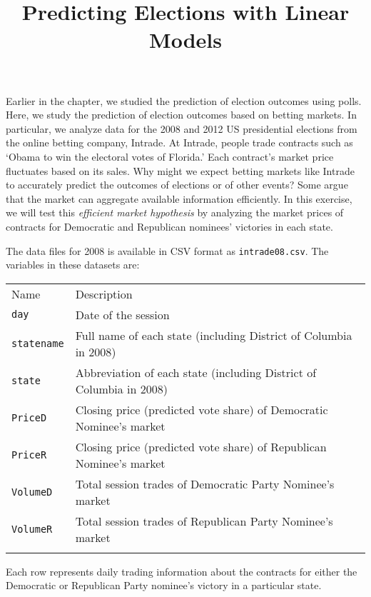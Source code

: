 \documentclass[]{article}
\title{Predicting Elections with Linear Models}
\author{}
\date{}
\begin{document}
\maketitle


Earlier in the chapter, we studied the prediction of election outcomes
using polls. Here, we study the prediction of election outcomes based on
betting markets. In particular, we analyze data for the 2008 and 2012 US
presidential elections from the online betting company, Intrade. At
Intrade, people trade contracts such as `Obama to win the electoral
votes of Florida.' Each contract's market price fluctuates based on its
sales. Why might we expect betting markets like Intrade to accurately
predict the outcomes of elections or of other events? Some argue that
the market can aggregate available information efficiently. In this
exercise, we will test this \emph{efficient market hypothesis} by
analyzing the market prices of contracts for Democratic and Republican
nominees' victories in each state.

The data files for 2008 is available in CSV format as
\texttt{intrade08.csv}. The variables in these datasets are:

\begin{longtable}[c]{@{}ll@{}}
\toprule\addlinespace
Name & Description
\\\addlinespace
\midrule\endhead
\texttt{day} & Date of the session
\\\addlinespace
\texttt{statename} & Full name of each state (including District of
Columbia in 2008)
\\\addlinespace
\texttt{state} & Abbreviation of each state (including District of
Columbia in 2008)
\\\addlinespace
\texttt{PriceD} & Closing price (predicted vote share) of Democratic
Nominee's market
\\\addlinespace
\texttt{PriceR} & Closing price (predicted vote share) of Republican
Nominee's market
\\\addlinespace
\texttt{VolumeD} & Total session trades of Democratic Party Nominee's
market
\\\addlinespace
\texttt{VolumeR} & Total session trades of Republican Party Nominee's
market
\\\addlinespace
\bottomrule
\end{longtable}

Each row represents daily trading information about the contracts for
either the Democratic or Republican Party nominee's victory in a
particular state.
\end{document}
